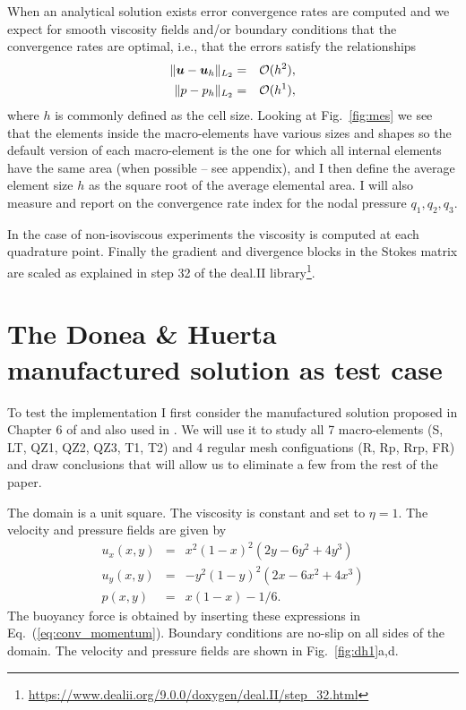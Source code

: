 \documentclass[a4paper,12pt]{article}
\begin{document}
When an analytical solution exists error convergence rates are computed and 
we expect for smooth viscosity fields and/or boundary conditions that the convergence rates 
are optimal, i.e., that the errors satisfy the relationships
\begin{eqnarray}
\| {\bm u} - {\bm u}_h \|_{L_2} &=&  {\cal O}(h^{2}),     \\  
\| p - p_h \|_{L_2}   &=& {\cal O}(h^{1}),
  \label{eq:error-rates}
\end{eqnarray}
where $h$ is commonly defined as the cell size.
Looking at Fig.~\ref{fig:mes} we see that the elements inside the macro-elements 
have various sizes and shapes so 
the default version of each macro-element is the one for which all internal elements have the same area
(when possible -- see appendix), and I then define the average element size
$h$ as the square root of the average elemental area.
I will also measure and report on the convergence rate index for the nodal pressure $q_1,q_2,q_3$.

In the case of non-isoviscous experiments the viscosity is computed at each 
quadrature point. Finally the gradient and divergence blocks in the Stokes matrix are
scaled as explained in step 32 of the deal.II library\footnote{\url{https://www.dealii.org/9.0.0/doxygen/deal.II/step_32.html}}.

\section{The Donea \& Huerta manufactured solution as test case}

To test the implementation I first consider the manufactured solution 
proposed in Chapter 6 of \cite{dohu03} and also used in \cite{thba22,thba25}.
We will use it to study all 7 macro-elements (S, LT, QZ1, QZ2, QZ3, T1, T2)
and 4 regular mesh configuations (R, Rp, Rrp, FR) and draw conclusions 
that will allow us to eliminate a few from the rest of the paper.
 
The domain is a unit square. The viscosity is constant and set to $\eta=1$.
The velocity and pressure fields are given by
\begin{eqnarray}
u_x(x,y) &=& x^2(1- x)^2 (2y - 6y^2 + 4y^3)  \\
u_y(x,y) &=& -y^2 (1 - y)^2 (2x - 6x^2 + 4x^3) \\
p(x,y) &=& x(1 -x)- 1/6. 
\end{eqnarray}
The buoyancy force is obtained by inserting these expressions in Eq.~(\ref{eq:conv_momentum}).
Boundary conditions are no-slip on all sides of the domain.
The velocity and pressure fields are shown in Fig.~\ref{fig:dh1}a,d.
\end{document}
